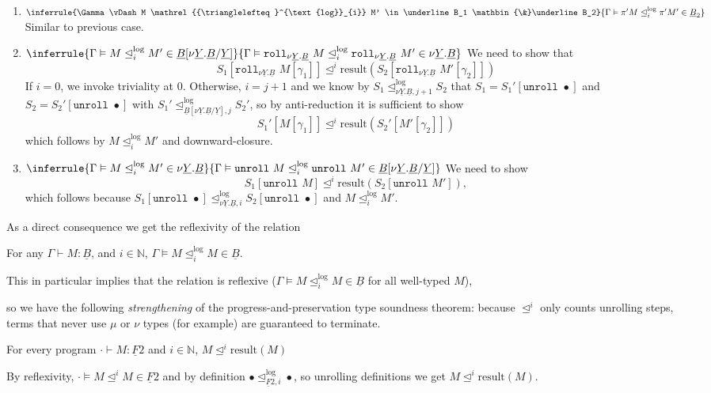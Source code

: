 \documentclass[acmsmall,screen,12pt]{acmart}
\renewcommand{\u}{\underline}
\newcommand{\apreorder}{\trianglelefteq}
\newcommand{\ix}[2]{\mathrel{#1^{#2}}}
\newcommand{\itylrof}[3]{\ilrof{#1}{#3,#2}}
\newcommand{\ilrof}[2]{\mathrel{{#1}^{\text{log}}_{#2}}}
\newcommand{\itylr}[2]{\itylrof{\apreorder}{#1}{#2}}
\newcommand{\ilr}[1]{\ilrof{\apreorder}{#1}}
\newcommand{\rollty}[1]{\texttt{roll}_{#1}\,\,}
\newcommand{\unroll}{\kw{unroll}}
\newcommand{\result}{\text{result}}
\newcommand{\kw}[1]{\texttt{#1}\,\,}
\newcommand{\with}{\mathbin{\&}}
\begin{document}
{\begin{longproof}
\begin{enumerate}
  \item $\inferrule {\Gamma \vDash M \ilr i M' \in \u B_1 \with \u
    B_2} {\Gamma \vDash \pi' M \ilr i \pi' M' \in \u B_2}$ Similar
    to previous case.

  \item $\inferrule
    {\Gamma \vDash M \ilr i M' \in \u B[{\nu \u Y. \u B}/\u Y]}
    {\Gamma \vDash \rollty{\nu \u Y. \u B} M \ilr i \rollty{\nu \u Y. \u B} M' \in {\nu \u Y. \u B}}$
    We need to show that
    \[ S_1[ \rollty{\nu \u Y. \u B} M[\gamma_1]]
    \ix\apreorder i \result(S_2[ \rollty{\nu \u Y. \u B} M'[\gamma_2]]) \]
    If $i = 0$, we invoke triviality at $0$.
    Otherwise, $i = j + 1$ and we know by $S_1 \itylr {j+1} {\nu \u Y. \u B} S_2$ that
    $S_1 = S_1'[\unroll \bullet]$ and $S_2 = S_2'[\unroll \bullet]$ with $S_1' \itylr j {\u B[{\nu \u Y. \u B}/\u Y]} S_2'$, so by anti-reduction it is sufficient to show
    \[ S_1'[ M[\gamma_1]] \ix\apreorder i \result(S_2'[ M'[\gamma_2]]) \]
    which follows by $M \ilr i M'$ and downward-closure.

  \item $\inferrule
    {\Gamma \vDash M \ilr i M' \in {\nu \u Y. \u B}}
    {\Gamma \vDash \unroll M \ilr i \unroll M' \in \u B[{\nu \u Y. \u B}/\u Y]}$
    We need to show
    \[S_1[\unroll M] \ix\apreorder i \result(S_2[\unroll M']),\] which
    follows because $S_1[\unroll \bullet] \itylr i {\nu \u Y. \u B}
    S_2[\unroll \bullet]$ and $M \ilr i M'$.
  \end{enumerate}
\end{longproof}

\begin{longonly}
As a direct consequence we get the reflexivity of the relation
\begin{corollary}[Reflexivity]
  For any $\Gamma \vdash M : \u B$, and $i \in \mathbb{N}$,
  \(\Gamma \vDash M \ilrof\apreorder i  M \in \u B.\)
\end{corollary}
\end{longonly}

\begin{shortonly}
  This in particular implies that the relation is reflexive ($\Gamma
  \vDash M \ilrof\apreorder i M \in \u B$ for all well-typed $M$),
\end{shortonly}
so we
have the following \emph{strengthening} of the progress-and-preservation
type soundness theorem: because $\ix\apreorder i$ only counts unrolling
steps, terms that never use $\mu$ or $\nu$ types (for example) are
guaranteed to terminate.
\begin{corollary}[Unary LR]
  For every program $\cdot \vdash M : \u F 2$ and $i \in \mathbb{N}$,
  $M \ix\apreorder i \result(M)$
\end{corollary}
\begin{longproof}
  By reflexivity, $\cdot \vDash M \ix\apreorder i M \in \u F 2$ and by
  definition $\bullet \itylrof\apreorder i {\u F 2} \bullet$, so
  unrolling definitions we get $M \ix\apreorder i \result(M)$.  
\end{longproof}

}
\end{document}
